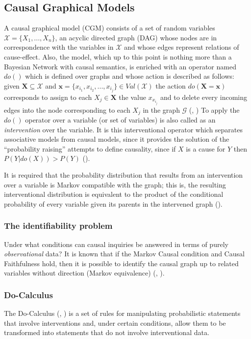 \documentclass[english,letterpaper,12pt,final]{article}
\theoremstyle{definition}
\begin{document}
	\subsection{Causal Graphical Models}
	A causal graphical model (CGM) consists of a set of random variables $\mathcal{X}=\{ X_1,...,X_n \}$, an acyclic directed graph (DAG) whose nodes are in correspondence with the variables in $\mathcal{X}$ and whose edges represent relations of cause-effect. Also, the model, which up to this point is nothing more than a Bayesian Network with causal semantics, is enriched with an operator named $do()$ which is defined over graphs and whose action is described as follows: given $\mathbf{X} \subseteq \mathcal{X}$ and $\mathbf{x} = \{ x_{i_1}, x_{i_2}, ... , x_{i_j} \} \in Val(\mathcal{X})$ the action $do(\mathbf{X} = \mathbf{x} )$ corresponds to assign to each $X_j \in \mathbf{X}$ the value $x_{x_{i_j}}$ and to delete every incoming edges into the node corresponding to each $X_j$ in the graph $\mathcal{G}$ (\cite{koller2009probabilistic}, \cite{sucar2015probabilistic}) To apply the $do()$ operator over a variable (or set of variables) is also called as an \textit{intervention} over the variable. It is this interventional operator which separates associative models from causal models, since it provides the solution of the “probability raising” attempts to define causality, since if $X$ is a cause for $Y$ then $P(Y | do(X)) > P(Y)$ (\cite{pearl2018why}).
	
	It is required that the probability distribution that results from an intervention over a variable is Markov compatible with the graph; this is, the resulting interventional distribution is equivalent to the product of the conditional probability of every variable given its parents in the intervened graph (\cite{sucar2015probabilistic}).
	\subsubsection{The identifiability problem}
	Under what conditions can causal inquiries be answered in terms of purely \textit{observational} data? It is known that if the Markov Causal condition and Causal Faithfulness hold, then it is possible to identify the causal graph up to related variables without direction (Markov equivalence) (\cite{peters2012identifiability}, \cite{mooij2016distinguishing}).
	\subsubsection{Do-Calculus}
The Do-Calculus (\cite{pearl1995causal}, \cite{pearl2009causality}) is a set of rules for manipulating probabilistic statements that involve interventions and, under certain conditions, allow them to be transformed into statements that do not involve interventional data. 
	
\end{document}

